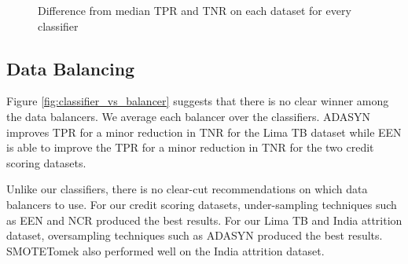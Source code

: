 \documentclass{sig-alternate-05-2015}
\begin{document}
	
	\begin{figure}
		\hspace*{1em}
		\centering
		\caption{Difference from median TPR and TNR on each dataset for every classifier}
		\label{fig:classifier_comparision}
	\end{figure}
	
	\subsection{Data Balancing}
	Figure \ref{fig:classifier_vs_balancer} suggests that there is no clear winner among the data balancers. We average each balancer over the classifiers. ADASYN improves TPR for a minor reduction in TNR for the Lima TB dataset while EEN is able to improve the TPR for a minor reduction in TNR for the two credit scoring datasets.
	
	Unlike our classifiers, there is no clear-cut recommendations on which data balancers to use. For our credit scoring datasets, under-sampling techniques such as EEN and NCR produced the best results. For our Lima TB and India attrition dataset, oversampling techniques such as ADASYN produced the best results. SMOTETomek also performed well on the India attrition dataset.
	
\end{document}
